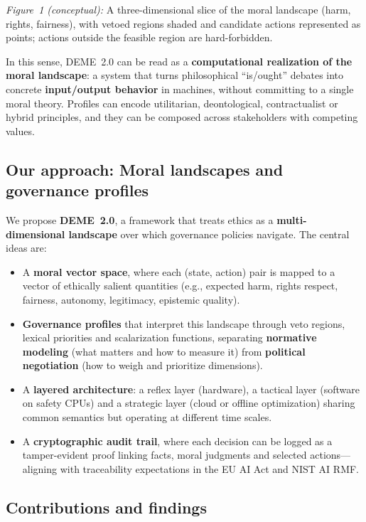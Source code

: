 \documentclass[11pt]{article}
\begin{document}
\medskip
\noindent\emph{Figure~1 (conceptual):} A three-dimensional slice of the moral landscape (harm, rights, fairness), with vetoed regions shaded and candidate actions represented as points; actions outside the feasible region are hard-forbidden.

\medskip
In this sense, DEME~2.0 can be read as a \textbf{computational realization of the moral landscape}: a system that turns philosophical ``is/ought'' debates into concrete \textbf{input/output behavior} in machines, without committing to a single moral theory. Profiles can encode utilitarian, deontological, contractualist or hybrid principles, and they can be composed across stakeholders with competing values.

\subsection{Our approach: Moral landscapes and governance profiles}

We propose \textbf{DEME~2.0}, a framework that treats ethics as a \textbf{multi-dimensional landscape} over which governance policies navigate. The central ideas are:

\begin{itemize}
  \item A \textbf{moral vector space}, where each (state, action) pair is mapped to a vector of ethically salient quantities (e.g., expected harm, rights respect, fairness, autonomy, legitimacy, epistemic quality).
  \item \textbf{Governance profiles} that interpret this landscape through veto regions, lexical priorities and scalarization functions, separating \textbf{normative modeling} (what matters and how to measure it) from \textbf{political negotiation} (how to weigh and prioritize dimensions).
  \item A \textbf{layered architecture}: a reflex layer (hardware), a tactical layer (software on safety CPUs) and a strategic layer (cloud or offline optimization) sharing common semantics but operating at different time scales.
  \item A \textbf{cryptographic audit trail}, where each decision can be logged as a tamper-evident proof linking facts, moral judgments and selected actions---aligning with traceability expectations in the EU AI Act and NIST AI RMF.
\end{itemize}

\subsection{Contributions and findings}
\end{document}

